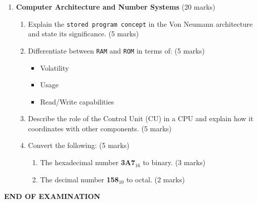 \documentclass[12pt]{article}
\begin{document}
\begin{enumerate}[left=0pt, label=\bfseries Q\arabic*.]
    \item \textbf{Computer Architecture and Number Systems} \hfill (20 marks)
    \begin{enumerate}[label=(\alph*)]
        \item Explain the \texttt{stored program concept} in the Von Neumann architecture and state its significance. \hfill (5 marks)
        \item Differentiate between \texttt{RAM} and \texttt{ROM} in terms of: \hfill (5 marks)
        \begin{itemize}
            \item Volatility
            \item Usage
            \item Read/Write capabilities
        \end{itemize}
        \item Describe the role of the Control Unit (CU) in a CPU and explain how it coordinates with other components. \hfill (5 marks)
        \item Convert the following: \hfill (5 marks)
        \begin{enumerate}
            \item The hexadecimal number \textbf{3A7$_{16}$} to binary. \hfill (3 marks)
            \item The decimal number \textbf{158$_{10}$} to octal. \hfill (2 marks)
        \end{enumerate}
    \end{enumerate}
\end{enumerate}

\vspace{1cm}
\begin{center}
    \textbf{END OF EXAMINATION}
\end{center}
\end{document}
